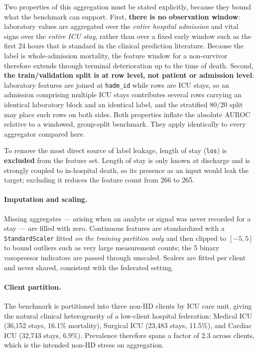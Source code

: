 \documentclass[pdflatex,sn-mathphys-num]{sn-jnl}
\begin{document}
Two properties of this aggregation must be stated explicitly, because they bound what the benchmark can support. First, \textbf{there is no observation window}: laboratory values are aggregated over the \emph{entire hospital admission} and vital signs over the \emph{entire ICU stay}, rather than over a fixed early window such as the first 24 hours that is standard in the clinical prediction literature. Because the label is whole-admission mortality, the feature window for a non-survivor therefore extends through terminal deterioration up to the time of death. Second, \textbf{the train/validation split is at row level, not patient or admission level}: laboratory features are joined at \texttt{hadm\_id} while rows are ICU stays, so an admission comprising multiple ICU stays contributes several rows carrying an identical laboratory block and an identical label, and the stratified 80/20 split may place such rows on both sides. Both properties inflate the absolute AUROC relative to a windowed, group-split benchmark. They apply identically to every aggregator compared here.

To remove the most direct source of label leakage, length of stay (\texttt{los}) is \textbf{excluded} from the feature set. Length of stay is only known at discharge and is strongly coupled to in-hospital death, so its presence as an input would leak the target; excluding it reduces the feature count from 266 to 265.

\paragraph{Imputation and scaling.} Missing aggregates --- arising when an analyte or signal was never recorded for a stay --- are filled with zero. Continuous features are standardized with a \texttt{StandardScaler} fitted \emph{on the training partition only} and then clipped to $[-5,5]$ to bound outliers such as very large measurement counts; the 5 binary vasopressor indicators are passed through unscaled. Scalers are fitted per client and never shared, consistent with the federated setting.

\paragraph{Client partition.} The benchmark is partitioned into three non-IID clients by ICU care unit, giving the natural clinical heterogeneity of a low-client hospital federation: Medical ICU (36{,}152 stays, 16.1\% mortality), Surgical ICU (23{,}483 stays, 11.5\%), and Cardiac ICU (32{,}743 stays, 6.9\%). Prevalence therefore spans a factor of $2.3$ across clients, which is the intended non-IID stress on aggregation.
\end{document}
